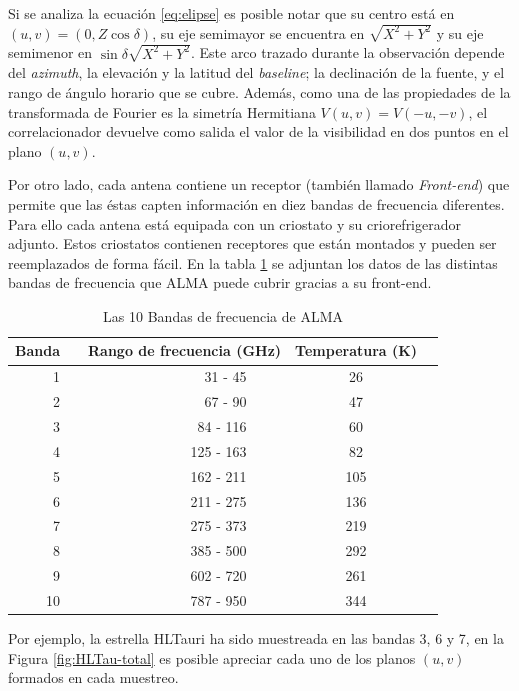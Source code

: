 Si se analiza la ecuación \ref{eq:elipse} es posible notar que su centro está en $(u,v)=(0,Z\cos{\delta})$, su eje semimayor se encuentra en $\sqrt{X^{2}+Y^{2}}$ y su eje semimenor en $\sin{\delta}\sqrt{X^{2}+Y^{2}}$. Este arco trazado durante la observación depende del \textit{azimuth}, la elevación y la latitud del \textit{baseline}; la declinación de la fuente, y el rango de ángulo horario que se cubre. Además, como una de las propiedades de la transformada de Fourier es la simetría Hermitiana $V(u,v)=V(-u,-v)$, el correlacionador devuelve como salida el valor de la visibilidad en dos puntos en el plano $(u,v)$.

\clearpage



Por otro lado, cada antena contiene un receptor (también llamado \textit{Front-end}) que permite que las éstas capten información en diez bandas de frecuencia diferentes. Para ello cada antena está equipada con un criostato y su criorefrigerador adjunto. Estos criostatos contienen receptores que están montados y pueden ser reemplazados de forma fácil. En la tabla \ref{tab:bands} se adjuntan los datos de las distintas bandas de frecuencia que ALMA puede cubrir gracias a su front-end.

\newcommand{\ra}[1]{\renewcommand{\arraystretch}{#1}}
\begin{table}[h!]
\centering
\ra{1.2}
\begin{tabular}{@{}rcrrcr@{}} 
\toprule
 \multicolumn{1}{c}{{\bf Banda}} & \phantom{a} & \multicolumn{2}{c}{{\bf Rango de frecuencia (GHz)}}  & \multicolumn{1}{c}{{\bf Temperatura (K)}} \\
 \midrule
 1   && 31 - 45 &&  26\\
 2   && 67 - 90 &&  47\\    
 3  && 84 - 116 &&  60\\
 4  && 125 - 163 &&  82\\
 5  && 162 - 211 &&  105\\
 6  && 211 - 275 &&  136\\
 7  && 275 - 373 &&  219\\
 8  && 385 - 500 &&  292\\
 9  && 602 - 720 &&  261\\
 10  && 787 - 950 &&  344\\
 \toprule
\end{tabular}
\caption{Las 10 Bandas de frecuencia de ALMA}
\label{tab:bands}
\end{table}

Por ejemplo, la estrella HLTauri ha sido muestreada en las bandas 3, 6 y 7, en la Figura \ref{fig:HLTau-total} es posible apreciar cada uno de los planos $(u,v)$ formados en cada muestreo.


